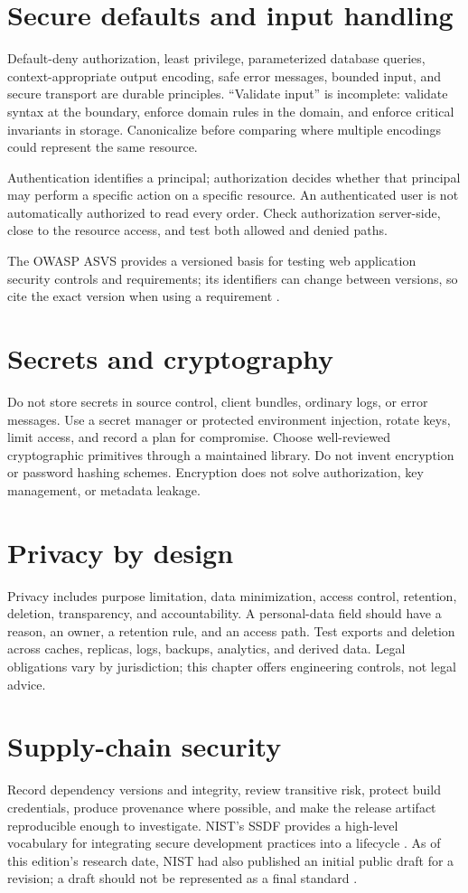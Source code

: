 \section{Secure defaults and input handling}
Default-deny authorization, least privilege, parameterized database queries,
context-appropriate output encoding, safe error messages, bounded input, and
secure transport are durable principles. “Validate input” is incomplete: validate
syntax at the boundary, enforce domain rules in the domain, and enforce critical
invariants in storage. Canonicalize before comparing where multiple encodings
could represent the same resource.

Authentication identifies a principal; authorization decides whether that
principal may perform a specific action on a specific resource. An authenticated
user is not automatically authorized to read every order. Check authorization
server-side, close to the resource access, and test both allowed and denied paths.

The OWASP ASVS provides a versioned basis for testing web application security
controls and requirements; its identifiers can change between versions, so cite
the exact version when using a requirement \cite{owasp2025asvs}.

\section{Secrets and cryptography}
Do not store secrets in source control, client bundles, ordinary logs, or error
messages. Use a secret manager or protected environment injection, rotate keys,
limit access, and record a plan for compromise. Choose well-reviewed cryptographic
primitives through a maintained library. Do not invent encryption or password
hashing schemes. Encryption does not solve authorization, key management, or
metadata leakage.

\section{Privacy by design}
Privacy includes purpose limitation, data minimization, access control,
retention, deletion, transparency, and accountability. A personal-data field
should have a reason, an owner, a retention rule, and an access path. Test exports
and deletion across caches, replicas, logs, backups, analytics, and derived data.
Legal obligations vary by jurisdiction; this chapter offers engineering
controls, not legal advice.

\section{Supply-chain security}
Record dependency versions and integrity, review transitive risk, protect build
credentials, produce provenance where possible, and make the release artifact
reproducible enough to investigate. NIST's SSDF provides a high-level vocabulary
for integrating secure development practices into a lifecycle \cite{nist2022ssdf}.
As of this edition's research date, NIST had also published an initial public
draft for a revision; a draft should not be represented as a final standard
\cite{nist2025ssdfdraft}.

